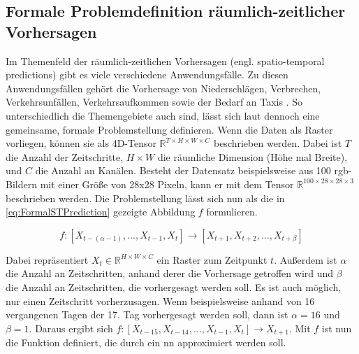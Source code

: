 \subsection{Formale Problemdefinition räumlich-zeitlicher Vorhersagen}
\label{sec:STPredictions}
Im Themenfeld der räumlich-zeitlichen Vorhersagen (engl. spatio-temporal predictions) gibt es viele verschiedene Anwendungsfälle.
Zu diesen Anwendungsfällen gehört die Vorhersage von Niederschlägen, Verbrechen, Verkehrsunfällen, Verkehrsaufkommen sowie der Bedarf an Taxis \cite{ConvLSTM,CrimeConvLSTM,CrimeSTResNet,HeteroConvLSTM,TrafficVolumeGraphDCRNN,STResNetOriginal}.
So unterschiedlich die Themengebiete auch sind, lässt sich laut \cite{DLTraff} dennoch eine gemeinsame, formale Problemstellung definieren.
Wenn die Daten als Raster vorliegen, können sie als 4D-Tensor $\mathbb{R}^{T \times H \times W \times C}$ beschrieben werden.
Dabei ist $T$ die Anzahl der Zeitschritte, $H \times W$ die räumliche Dimension (Höhe mal Breite), und $C$ die Anzahl an Kanälen.
Besteht der Datensatz beispielsweise aus 100 \acrshort{rgb}-Bildern mit einer Größe von 28x28 Pixeln, kann er mit dem Tensor $\mathbb{R}^{100 \times 28 \times 28 \times 3}$ beschrieben werden.
Die Problemstellung lässt sich nun als die in \autoref{eq:FormalSTPrediction} gezeigte Abbildung $f$ formulieren.

\begin{equation}
    f: [X_{t-(\alpha-1)}, \dots, X_{t-1}, X_t] \to [X_{t+1}, X_{t+2}, \dots, X_{t+\beta}]
\label{eq:FormalSTPrediction}
\end{equation}

Dabei repräsentiert $X_t \in \mathbb{R}^{H \times W \times C}$ ein Raster zum Zeitpunkt $t$.
Außerdem ist $\alpha$ die Anzahl an Zeitschritten, anhand derer die Vorhersage getroffen wird und $\beta$ die Anzahl an Zeitschritten, die vorhergesagt werden soll.
Es ist auch möglich, nur einen Zeitschritt vorherzusagen.
Wenn beispielsweise anhand von 16 vergangenen Tagen der 17. Tag vorhergesagt werden soll, dann ist $\alpha = 16$ und $\beta = 1$.
Daraus ergibt sich $f: [X_{t-15}, X_{t-14}, \dots, X_{t-1}, X_t] \to X_{t+1}$.
Mit $f$ ist nun die Funktion definiert, die durch ein \acrshort{nn} approximiert werden soll.

